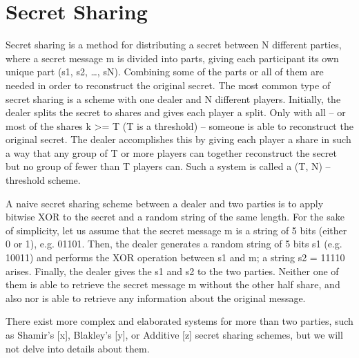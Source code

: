 \section{Secret Sharing}
Secret sharing is a method  for distributing a secret between N different parties, where a secret message m is divided into parts, giving each participant its own unique part (s1, s2, …, sN).
Combining some of the parts or all of them are needed in order to reconstruct the original secret. The most common type of secret sharing is a scheme with one dealer and N different players.
Initially, the dealer splits the secret to shares and gives each player a split. Only with all – or most of the shares k >= T  (T is a threshold) – someone is able to reconstruct the original secret.
The dealer accomplishes this by giving each player a share in such a way that any group of T or more players can together reconstruct the secret but no group of fewer than T players can. Such a system is called a (T, N) – threshold scheme.

A naive secret sharing scheme between a dealer and two parties is to apply bitwise XOR to the secret and a random string of the same length.
For the sake of simplicity, let us assume that the secret message m is a string of 5 bits (either 0 or 1), e.g. 01101.
Then, the dealer generates a random string of 5 bits s1 (e.g. 10011) and performs the XOR operation between s1 and m; a string s2 = 11110 arises.
Finally, the dealer gives the s1 and s2 to the two parties.
Neither one of them is able to retrieve the secret message m without the other half share, and also nor is able to retrieve any information about the original message.

There exist more complex and elaborated systems for more than two parties, such as Shamir’s [x], Blakley’s [y], or Additive [z] secret sharing schemes, but we will not delve into details about them.
